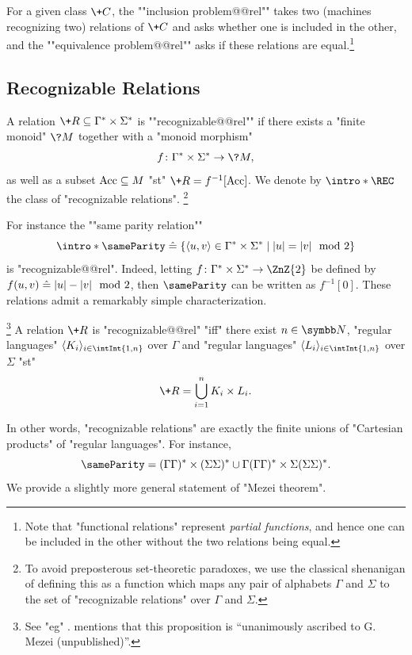 For a given class $\+C$, the \AP""inclusion problem@@rel"" takes two (machines recognizing two) 
relations of $\+C$ and asks whether one is included in the other, and the \AP""equivalence 
problem@@rel"" asks if these relations are equal.\footnote{Note that "functional relations"
represent \emph{partial functions}, and hence one can be included in the other without the
two relations being equal.}



\subsection{Recognizable Relations}

A relation $\+R \subseteq \Gamma^* \times \Sigma^*$ is \AP""recognizable@@rel""
if there exists a "finite monoid" $\?M$ together with a "monoid morphism"
\[
	f\colon \Gamma^* \times \Sigma^* \to \?M,
\]
as well as a subset $\textrm{Acc} \subseteq M$ "st"
$\+R = f^{-1}[\Acc]$. We denote by \AP$\intro*\REC$ the class of "recognizable relations".%
\footnote{To avoid preposterous set-theoretic paradoxes, 
we use the classical shenanigan of defining this as a function which maps
any pair of alphabets $\Gamma$ and $\Sigma$ to the set of "recognizable relations" over $\Gamma$ and $\Sigma$.}

For instance the \AP""same parity relation""
\[
	{\intro*\sameParity} \defeq 
	\{
		\tup{u,v} \in \Gamma^* \times \Sigma^* \mid
		|u| = |v| \mod{2}
	\}
\]
is "recognizable@@rel". Indeed, letting $f\colon  \Gamma^* \times \Sigma^* \to \ZnZ{2}$
be defined by $f(u,v) \mathrel{\hat{=}} |u| - |v| \mod{2}$,
then $\sameParity$ can be written as $f^{-1}[0]$.
These relations admit a remarkably simple characterization.\AP
\begin{proposition}
	\!\footnote{See "eg" \cite[Corollary~II.2.20, p.~254]{Sakarovitch2009Elements}.
	\cite[\S~2, ``Notes \& references'']{Sakarovitch2009Elements} mentions
	that this proposition is ``unanimously ascribed to G. Mezei (unpublished)''.}
	\label{prop:Mezei-theorem}
	A relation $\+R$ is "recognizable@@rel" "iff" there exist $n\in\N$,
	"regular languages" $\tup{K_i}_{i\in \intInt{1,n}}$ over $\Gamma$
	and "regular languages" $\tup{L_i}_{i\in \intInt{1,n}}$ over $\Sigma$
	"st"
	\[
		\+R = \bigcup_{i=1}^n K_i \times L_i.
	\]
\end{proposition}

In other words, "recognizable relations" are exactly the finite unions of
"Cartesian products" of "regular languages".
For instance, \[{\sameParity} =
(\Gamma\Gamma)^* \times (\Sigma\Sigma)^*
\cup \Gamma(\Gamma\Gamma)^* \times \Sigma(\Sigma\Sigma)^*.\]
We provide a slightly more general statement of "Mezei theorem".

